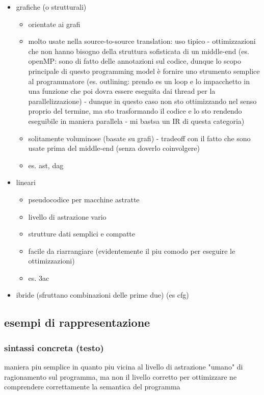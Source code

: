 \begin{itemize}
  \item grafiche (o strutturali)
    \begin{itemize}
      \item orientate ai grafi
      \item molto usate nella source-to-source translation: uso tipico - ottimizzazioni che non hanno bisogno della struttura sofisticata di un middle-end (es. openMP: sono di fatto delle annotazioni sul codice, dunque lo scopo principale di questo programming model \`e fornire uno strumento semplice al programmatore (es. outlining: prendo es un loop e lo impacchetto in una funzione che poi dovra essere eseguita dai thread per la parallelizzazione) - dunque in questo caso non sto ottimizzando nel senso proprio del termine, ma sto trasformando il codice e lo sto rendendo eseguibile in maniera parallela - mi bastsa un IR di questa categoria)
      \item solitamente voluminose (basate su grafi) - tradeoff con il fatto che sono usate prima del middle-end (senza doverlo coinvolgere)
      \item es. ast, dag
    \end{itemize}
  \item lineari
    \begin{itemize}
      \item pseudocodice per macchine astratte
      \item livello di astrazione vario
      \item strutture dati semplici e compatte
      \item facile da riarrangiare (evidentemente il piu comodo per eseguire le ottimizzazioni)
      \item es. 3ac
    \end{itemize}
  \item ibride (sfruttano combinazioni delle prime due) (es cfg)
\end{itemize}
\subsection{esempi di rappresentazione}


\subsubsection{sintassi concreta (testo)}

maniera piu semplice in quanto piu vicina al livello di astrazione "umano" di ragionamento sul programma, ma non il livello corretto per ottimizzare ne comprendere correttamente la semantica del programma

